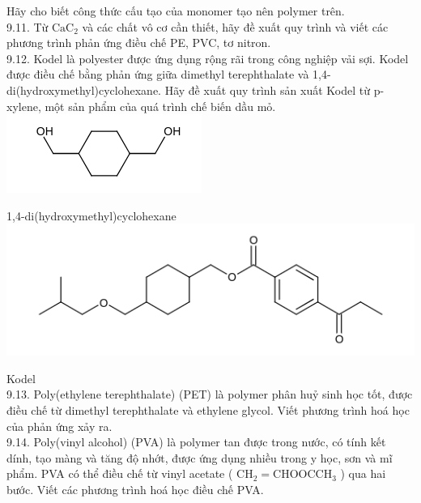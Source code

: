 \documentclass[10pt]{article}
\begin{document}
Hãy cho biết công thức cấu tạo của monomer tạo nên polymer trên.\\
9.11. Từ $\mathrm{CaC}_{2}$ và các chất vô cơ cần thiết, hãy đề xuất quy trình và viết các phương trình phản ứng điều chế PE, PVC, tơ nitron.\\
9.12. Kodel là polyester được ứng dụng rộng rãi trong công nghiệp vải sợi. Kodel được điều chế bằng phản ứng giữa dimethyl terephthalate và 1,4-di(hydroxymethyl)cyclohexane. Hãy đề xuất quy trình sản xuất Kodel từ p-xylene, một sản phẩm của quá trình chế biến dầu mỏ.\\
\includegraphics{smile-5f038ff7586cb5d2ada441ec56aa6c7307d99267}

1,4-di(hydroxymethyl)cyclohexane\\
\includegraphics{smile-0618d539f784a10ea2493fa50889d61c12554511}

Kodel\\
9.13. Poly(ethylene terephthalate) (PET) là polymer phân huỷ sinh học tốt, được điều chế từ dimethyl terephthalate và ethylene glycol. Viết phương trình hoá học của phản ứng xảy ra.\\
9.14. Poly(vinyl alcohol) (PVA) là polymer tan được trong nước, có tính kết dính, tạo màng và tăng độ nhớt, được ứng dụng nhiều trong y học, sơn và mĩ phẩm. PVA có thể điều chế từ vinyl acetate ( $\mathrm{CH}_{2}=\mathrm{CHOOCCH}_{3}$ ) qua hai bước. Viết các phương trình hoá học điều chế PVA.
\end{document}
